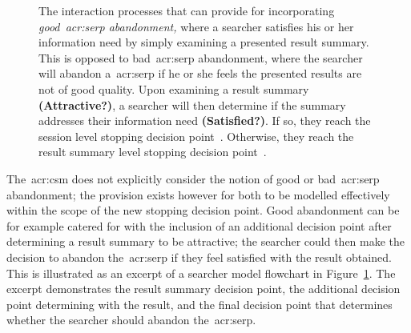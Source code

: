 \begin{figure}[t!]
    \centering
    \caption[Good abandonment flowchart]{The interaction processes that can provide for incorporating \emph{good~\gls{acr:serp} abandonment,} where a searcher satisfies his or her information need by simply examining a presented result summary. This is opposed to bad~\gls{acr:serp} abandonment, where the searcher will abandon a~\gls{acr:serp} if he or she feels the presented results are not of good quality. Upon examining a result summary \textbf{(Attractive?)}, a searcher will then determine if the summary addresses their information need \textbf{(Satisfied?)}. If so, they reach the session level stopping decision point~. Otherwise, they reach the result summary level stopping decision point~.}
    \label{fig:good}
\end{figure}

The~\gls{acr:csm} does not explicitly consider the notion of good or bad~\gls{acr:serp} abandonment; the provision exists however for both to be modelled effectively within the scope of the new stopping decision point. Good abandonment can be for example catered for with the inclusion of an additional decision point after determining a result summary to be attractive; the searcher could then make the decision to abandon the~\gls{acr:serp} if they feel satisfied with the result obtained. This is illustrated as an excerpt of a searcher model flowchart in Figure~\ref{fig:good}. The excerpt demonstrates the result summary  decision point, the additional decision point determining  with the result, and the final decision point that determines whether the searcher should abandon the~\gls{acr:serp}.

